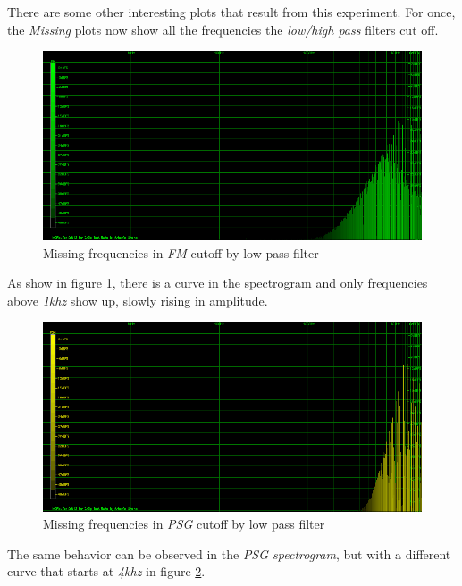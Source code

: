 \documentclass[10pt,a4paper]{report}
\begin{document}
There are some other interesting plots that result from this experiment. For once, the \textit{Missing} plots now show all the frequencies the \textit{low/high pass} filters cut off.

\begin{figure}[H]
	\centering
	\includegraphics[width=1.0\linewidth]{plots/Plot4-4-Missing-FM}
	\caption[Missing FM]{Missing frequencies in \textit{FM} cutoff by low pass filter}
	\label{fig:plot4-4-missing-fm}
\end{figure}

As show in figure \ref{fig:plot4-4-missing-fm}, there is a curve in the spectrogram and only frequencies above \textit{1khz} show up, slowly rising in amplitude.

\begin{figure}[H]
	\centering
	\includegraphics[width=1.0\linewidth]{plots/Plot4-5-Missing-PSG}
	\caption[Missing PSG]{Missing frequencies in \textit{PSG} cutoff by low pass filter}
	\label{fig:plot4-5-missing-psg}
\end{figure}

The same behavior can be observed in the \textit{PSG spectrogram}, but with a different curve that starts at \textit{4khz} in figure \ref{fig:plot4-5-missing-psg}.
\end{document}
